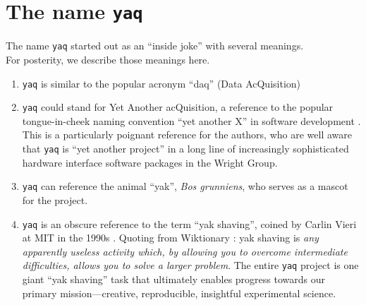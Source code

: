\documentclass[11pt, full]{article}
\newcommand\yaq{\texttt{yaq}}
\let\stdsection\section
\renewcommand\section{\clearpage\stdsection}
\begin{document}
\section{The name \yaq{}}

The name \yaq{} started out as an ``inside joke'' with several meanings. \\
For posterity, we describe those meanings here.
\begin{enumerate}
  \item \yaq{} is similar to the popular acronym ``daq'' (Data AcQuisition)
  \item \yaq{} could stand for Yet Another acQuisition, a reference to the popular tongue-in-cheek naming convention ``yet another X'' in software development \cite{Raymond_1996}. This is a particularly poignant reference for the authors, who are well aware that \yaq{} is ``yet another project'' in a long line of increasingly sophisticated hardware interface software packages in the Wright Group.
  \item \yaq{} can reference the animal ``yak'', \textit{Bos grunniens}, who serves as a mascot for the project.
  \item \yaq{} is an obscure reference to the term ``yak shaving'', coined by Carlin Vieri at MIT in the 1990s \cite{CarlinVieri}. Quoting from Wiktionary \cite{yak_shaving}: yak shaving is \textit{any apparently useless activity which, by allowing you to overcome intermediate difficulties, allows you to solve a larger problem}. The entire \yaq{} project is one giant ``yak shaving'' task that ultimately enables progress towards our primary mission---creative, reproducible, insightful experimental science.
\end{enumerate}

\clearpage

\printbibliography
\end{document}
